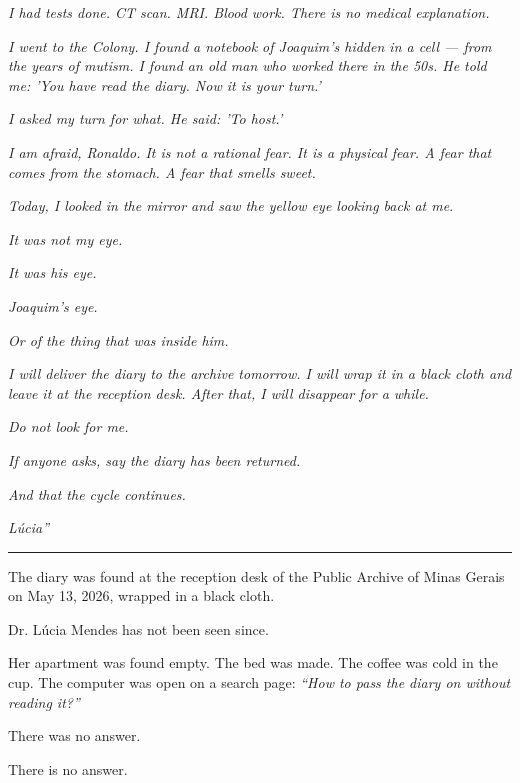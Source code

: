 \noindent \textit{I had tests done. CT scan. MRI. Blood work. There is no medical explanation.}

\noindent \textit{I went to the Colony. I found a notebook of Joaquim's hidden in a cell --- from the years of mutism. I found an old man who worked there in the 50s. He told me: 'You have read the diary. Now it is your turn.'}

\noindent \textit{I asked my turn for what. He said: 'To host.'}

\noindent \textit{I am afraid, Ronaldo. It is not a rational fear. It is a physical fear. A fear that comes from the stomach. A fear that smells sweet.}

\noindent \textit{Today, I looked in the mirror and saw the yellow eye looking back at me.}

\noindent \textit{It was not my eye.}

\noindent \textit{It was his eye.}

\noindent \textit{Joaquim's eye.}

\noindent \textit{Or of the thing that was inside him.}

\noindent \textit{I will deliver the diary to the archive tomorrow. I will wrap it in a black cloth and leave it at the reception desk. After that, I will disappear for a while.}

\noindent \textit{Do not look for me.}

\noindent \textit{If anyone asks, say the diary has been returned.}

\noindent \textit{And that the cycle continues.}

\noindent \textit{Lúcia\textquotedblright{}}

\vspace{0.5em}\noindent\rule{\textwidth}{0.5pt}\vspace{0.5em}

\noindent The diary was found at the reception desk of the Public Archive of Minas Gerais on May 13, 2026, wrapped in a black cloth.

\noindent Dr. Lúcia Mendes has not been seen since.

\noindent Her apartment was found empty. The bed was made. The coffee was cold in the cup. The computer was open on a search page: \textit{\textquotedblleft{}How to pass the diary on without reading it?\textquotedblright{}}

\noindent There was no answer.

\noindent There is no answer.

